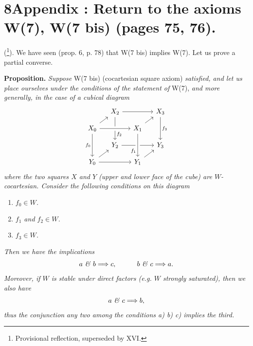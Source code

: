 \documentclass[11pt]{article}
\newcommand{\msp}[1]{\marginpar{\footnotesize [#1]}}
\begin{document}
\msp{page 265}

\section*{8\quad Appendix : Return to the axioms W(7), W(7 bis) (pages 75, 76).}

(\footnote[135]{Provisional reflection, superseded by XVI.}). We have seen (prop. 6, p. 78) that W(7 bis) implies W(7). Let us prove a partial converse. %

\textbf{Proposition.} \textit{Suppose} W(7 bis) (cocartesian square axiom) \textit{satisfied, and let us place ourselves under the conditions of the statement of} W(7), \textit{and more generally, in the case of a cubical diagram}
\[
\begin{tikzcd}[ampersand replacement=\&, row sep=small, column sep=small]
 \& X_2 \arrow[rr] \arrow[dd, "f_2" near end] \& \& X_3 \arrow[dd, "f_3"] \\
X_0 \arrow[ur] \arrow[rr, crossing over] \arrow[dd, "f_0"'] \& \& X_1 \arrow[ur] \& \\
 \& Y_2 \arrow[rr] \& \& Y_3 \\
Y_0 \arrow[ur] \arrow[rr] \& \& Y_1 \arrow[ur] \arrow[from=uu, crossing over, "f_1"' near end] \&
\end{tikzcd}
\]
\textit{where the two squares $X$ and $Y$ (upper and lower face of the cube) are $W$-cocartesian. Consider the following conditions on this diagram}
\begin{enumerate}[label={}]
\item[\textit{a)}] \textit{$f_0 \in W$.}
\item[\textit{b)}] \textit{$f_1$ and $f_2 \in W$.}
\item[\textit{c)}] \textit{$f_3 \in W$.}
\end{enumerate}
\textit{Then we have the implications}
\[
a \text{ \textit{\&} } b \Longrightarrow c, \qquad\quad b \text{ \textit{\&} } c \Longrightarrow a.
\]
\textit{Moreover, if $W$ is stable under direct factors (e.g. $W$ strongly saturated), then we also have}
\[
a \text{ \textit{\&} } c \Longrightarrow b,
\]
\textit{thus the conjunction} \textit{any two among the conditions a) b) c) implies the third.}
\end{document}
